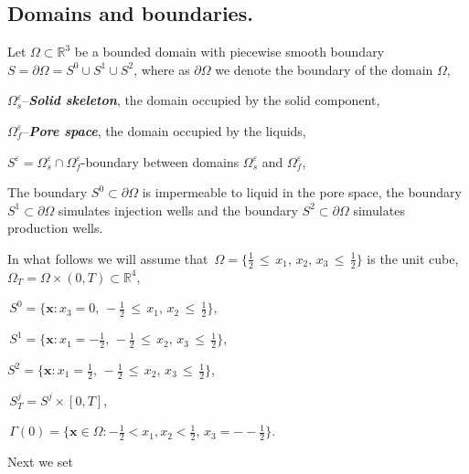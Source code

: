 \documentclass{article}
\theoremstyle{plain}
\theoremstyle{definition}
\numberwithin{equation}{section}
\begin{document}
\subsection{Domains and boundaries.}

Let $\Omega\subset\mathbb{R}^{3}$ be a bounded domain with piecewise smooth boundary
$S=\partial\Omega={S}^{0}\cup{S}^{1}\cup{S}^{2}$, where as $\partial\Omega$
we denote the boundary of the domain $\Omega$,

$\Omega^{\varepsilon}_{s}$--\textbf{\emph{Solid skeleton}}, the domain occupied by the solid component,

$\Omega^{\varepsilon}_{f}$--\textbf{\emph{Pore space}}, the domain occupied by the liquids,

${S}^{\varepsilon}={\Omega}^{\varepsilon}_{s}\cap{\Omega}^{\varepsilon}_{f}$-boundary between domains $\Omega^{\varepsilon}_{s}$ and $\Omega^{\varepsilon}_{f}$,

The boundary $S^{0}\subset\partial\Omega$ is impermeable to liquid in the pore space,
the boundary $S^{1}\subset\partial\Omega$ simulates injection wells and the boundary
$S^{2}\subset\partial\Omega$ simulates production wells.

In what follows we will assume that $\displaystyle\,{\Omega}=\{\tfrac{1}{2}\,\leqslant\,x_{1},\,x_{2},\,x_{3}\,
\leqslant\,\tfrac{1}{2}\}$ is the unit cube, ${\Omega}_{T}={\Omega}\times(0,T)\subset\mathbb{R}^{4}$,

$\displaystyle\,S^{0}=\{\boldsymbol{x}:x_{3}=0,\,-\tfrac{1}{2}\,\leqslant\,x_{1},\,x_{2}\,
\leqslant\,\tfrac{1}{2}\}$,

$\displaystyle\,S^{1}=\{\boldsymbol{x}:x_{1}=
-\tfrac{1}{2},\,-\tfrac{1}{2}\,\leqslant\,x_{2},\,x_{3}\,\leqslant\,\tfrac{1}{2}\}$,

$S^{2}=\{\boldsymbol{x}:x_{1}=\tfrac{1}{2},\,-\tfrac{1}{2}\,
\leqslant\,x_{2},\,x_{3}\,\leqslant\,\tfrac{1}{2}\}$,

$\displaystyle\,S^{j}_{T}=S^{j}\times[0,T]$,

$\displaystyle\,\Gamma(0)=
\{\boldsymbol{x}\in\Omega:-\tfrac{1}{2}<x_{1},x_{2}<\tfrac{1}{2},\,x_{3}=--\tfrac{1}{2}\}$.

Next we set
\end{document}
